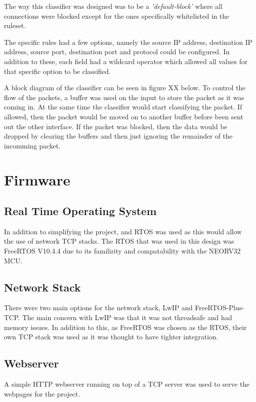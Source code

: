 The way this classifier was designed was to be a \textit{'default-block'} where all connections were blocked except for the ones specifically whitelisted in the ruleset. 

The specific rules had a few options, namely the source IP address, destination IP address, source port, destination port and protocol could be configured. In addition to these, each field had a wildcard operator which allowed all values for that specific option to be classified. 

A block diagram of the classifier can be seen in figure XX below. To control the flow of the packets, a buffer was used on the input to store the packet as it was coming in. At the same time the classifier would start classifying the packet. If allowed, then the packet would be moved on to another buffer before been sent out the other interface. If the packet was blocked, then the data would be dropped by clearing the buffers and then just ignoring the remainder of the incomming packet. 





\section{Firmware}

\subsection{Real Time Operating System}
In addition to simplifying the project, and RTOS was used as this would allow the use of network TCP stacks. The RTOS that was used in this design was FreeRTOS V10.4.4 due to its familirity and compatability with the NEORV32 MCU.


\subsection{Network Stack}
There were two main options for the network stack, LwIP and FreeRTOS-Plus-TCP. The main concern with LwIP was that it was not threadsafe and had memory issues. In addition to this, as FreeRTOS was chosen as the RTOS, their own TCP stack was used as it was thought to have tighter integration. 


\subsection{Webserver}
A simple HTTP webserver running on top of a TCP server was used to serve the webpages for the project. 

